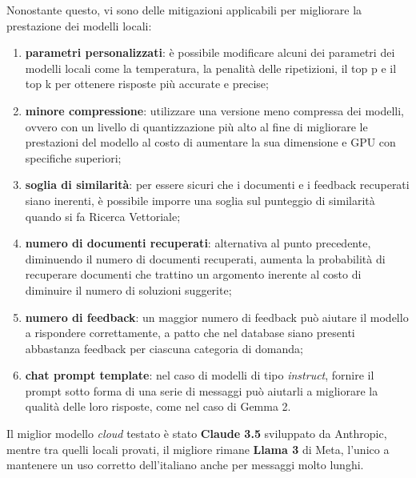 \newpage
Nonostante questo, vi sono delle mitigazioni applicabili per migliorare la prestazione dei modelli locali: 
\begin{enumerate}
    \item \textbf{parametri personalizzati}: è possibile modificare alcuni dei parametri 
    dei modelli locali come la temperatura, la penalità delle ripetizioni, il top p e il 
    top k per ottenere risposte più accurate e precise;
    \item \textbf{minore compressione}: utilizzare una versione meno compressa dei modelli, 
    ovvero con un livello di quantizzazione più alto al fine di migliorare le prestazioni 
    del modello al costo di aumentare la sua dimensione e GPU con specifiche superiori;
    \item \textbf{soglia di similarità}: per essere sicuri che i documenti e i feedback 
    recuperati siano inerenti, è possibile imporre una soglia sul punteggio di similarità
    quando si fa Ricerca Vettoriale; 
    \item \textbf{numero di documenti recuperati}: alternativa al punto precedente, 
    diminuendo il numero di documenti recuperati, aumenta la probabilità di recuperare 
    documenti che trattino un argomento inerente al costo di diminuire il numero di 
    soluzioni suggerite;
    \item \textbf{numero di feedback}: un maggior numero di feedback può aiutare il 
    modello a rispondere correttamente, a patto che nel database siano presenti abbastanza 
    feedback per ciascuna categoria di domanda;
    \item \textbf{chat prompt template}: nel caso di modelli di tipo \textit{instruct}, 
    fornire il prompt sotto forma di una serie di messaggi può aiutarli a migliorare la 
    qualità delle loro risposte, come nel caso di Gemma 2.
\end{enumerate}

Il miglior modello \textit{cloud} testato è stato \textbf{Claude 3.5} sviluppato da Anthropic, mentre tra quelli locali provati, il migliore rimane \textbf{Llama 3} di Meta, l'unico a mantenere un uso corretto dell'italiano anche per messaggi molto lunghi.




\newpage